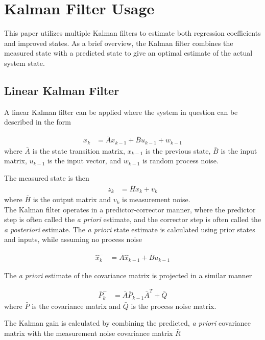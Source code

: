 \section{Kalman Filter Usage}
\label{kalman-filter}
This paper utilizes multiple Kalman filters to estimate both regression coefficients and improved states. As a brief overview, the Kalman filter combines the measured state with a predicted state to give an optimal\cite{kalman60} estimate of the actual system state.

\subsection*{Linear Kalman Filter}
A linear Kalman filter can be applied\cite{welch1995introduction} where the system in question can be described in the form 

\begin{align}
x_k &= \bar{A}x_{k-1} + \bar{B}u_{k-1}+w_{k-1}
\end{align}
\noindent
where $\bar{A}$ is the state transition matrix, $x_{k-1}$ is the previous state, $\bar{B}$ is the input matrix, $u_{k-1}$ is the input vector, and $w_{k-1}$ is random process noise.

The measured state is then 
\begin{align}
z_k &= \bar{H}x_k+v_k
\end{align} 
\noindent
where $\bar{H}$ is the output matrix and $v_k$ is measurement noise.\\
The Kalman filter operates in a predictor-corrector manner, where the predictor step is often called the \textit{a priori} estimate, and the corrector step is often called the \textit{a posteriori} estimate. The \textit{a priori} state estimate is calculated using prior states and inputs, while assuming no process noise

\begin{align}
\hat{x}^-_k &= \bar{A}\hat{x}_{k-1}+\bar{B}u_{k-1}
\end{align}

The \textit{a priori} estimate of the covariance matrix is projected in a similar manner

\begin{align}
\bar{P}^-_k &= \bar{A}\bar{P}_{k-1}\bar{A}^T+\bar{Q}
\end{align}
\noindent
where $\bar{P}$ is the covariance matrix and $\bar{Q}$ is the process noise matrix.

The Kalman gain is calculated by combining the predicted, \textit{a priori} covariance matrix with the measurement noise covariance matrix $\bar{R}$

